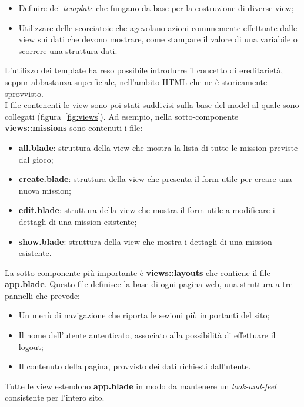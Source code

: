 \begin{itemize}
	\item Definire dei \textit{template} che fungano da base per la costruzione di diverse view;
	\item Utilizzare delle scorciatoie che agevolano azioni comunemente effettuate dalle view sui dati che devono mostrare, come stampare il valore di una variabile o scorrere una struttura dati.
\end{itemize}

L'utilizzo dei template ha reso possibile introdurre il concetto di ereditarietà, seppur abbastanza superficiale, nell'ambito HTML che ne è storicamente sprovvisto. \\
I file contenenti le view sono poi stati suddivisi sulla base del model al quale sono collegati (figura~\ref{fig:views}). Ad esempio, nella sotto-componente \textbf{views::missions} sono contenuti i file:

\begin{itemize}
	\item \textbf{all.blade}: struttura della view che mostra la lista di tutte le mission previste dal gioco;
	\item \textbf{create.blade}: struttura della view che presenta il form utile per creare una nuova mission;
	\item \textbf{edit.blade}: struttura della view che mostra il form utile a modificare i dettagli di una mission esistente;
	\item \textbf{show.blade}: struttura della view che mostra i dettagli di una mission esistente.
\end{itemize}

La sotto-componente più importante è \textbf{views::layouts} che contiene il file \textbf{app.blade}. Questo file definisce la base di ogni pagina web, una struttura a tre pannelli che prevede: 

\begin{itemize}
	\item Un menù di navigazione che riporta le sezioni più importanti del sito;
	\item Il nome dell'utente autenticato, associato alla possibilità di effettuare il logout;
	\item Il contenuto della pagina, provvisto dei dati richiesti dall'utente.
\end{itemize}

Tutte le view estendono \textbf{app.blade} in modo da mantenere un \textit{look-and-feel} consistente per l'intero sito.

